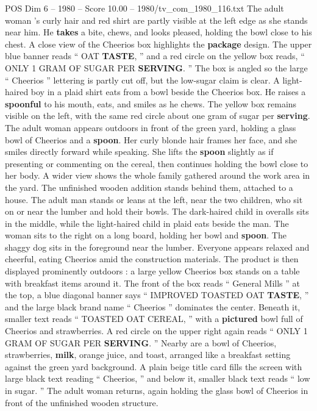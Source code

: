 \begin{textsample}{POS Dim 6 – 1980 – Score 10.00 – 1980/tv\_com\_1980\_116.txt}
The adult woman ’s curly hair and red shirt are partly visible at the left edge as she stands near him.
He \textbf{takes} a bite, chews, and looks pleased, holding the bowl close to his chest.
A close view of the Cheerios box highlights the \textbf{package} design.
The upper blue banner reads “ OAT \textbf{TASTE}, ” and a red circle on the yellow box reads, “ ONLY 1 GRAM OF SUGAR PER \textbf{SERVING}. ” The box is angled so the large “ Cheerios ” lettering is partly cut off, but the low-sugar claim is clear.
A light-haired boy in a plaid shirt eats from a bowl beside the Cheerios box.
He raises a \textbf{spoonful} to his mouth, eats, and smiles as he chews.
The yellow box remains visible on the left, with the same red circle about one gram of sugar per \textbf{serving}.
The adult woman appears outdoors in front of the green yard, holding a glass bowl of Cheerios and a \textbf{spoon}.
Her curly blonde hair frames her face, and she smiles directly forward while speaking.
She lifts the \textbf{spoon} slightly as if presenting or commenting on the cereal, then continues holding the bowl close to her body.
A wider view shows the whole family gathered around the work area in the yard.
The unfinished wooden addition stands behind them, attached to a house.
The adult man stands or leans at the left, near the two children, who sit on or near the lumber and hold their bowls.
The dark-haired child in overalls sits in the middle, while the light-haired child in plaid eats beside the man.
The woman sits to the right on a long board, holding her bowl and \textbf{spoon}.
The shaggy dog sits in the foreground near the lumber.
Everyone appears relaxed and cheerful, eating Cheerios amid the construction materials.
The product is then displayed prominently outdoors : a large yellow Cheerios box stands on a table with breakfast items around it.
The front of the box reads “ General Mills ” at the top, a blue diagonal banner says “ IMPROVED TOASTED OAT \textbf{TASTE}, ” and the large black brand name “ Cheerios ” dominates the center.
Beneath it, smaller text reads “ TOASTED OAT CEREAL, ” with a \textbf{pictured} bowl full of Cheerios and strawberries.
A red circle on the upper right again reads “ ONLY 1 GRAM OF SUGAR PER \textbf{SERVING}. ” Nearby are a bowl of Cheerios, strawberries, \textbf{milk}, orange juice, and toast, arranged like a breakfast setting against the green yard background.
A plain beige title card fills the screen with large black text reading “ Cheerios, ” and below it, smaller black text reads “ low in sugar. ” The adult woman returns, again holding the glass bowl of Cheerios in front of the unfinished wooden structure.

\end{textsample}
